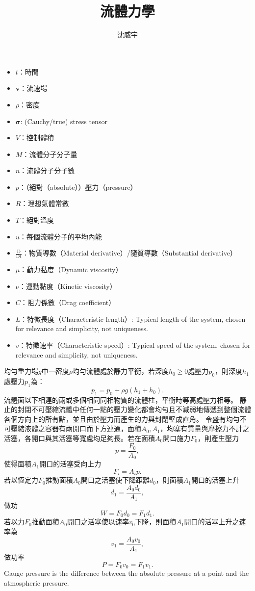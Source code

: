 \documentclass[a4paper,12pt]{article}
\begin{document}
\title{流體力學}
\author{沈威宇}
\date{\temtoday}
\titletocdoc
{}
\begin{itemize}
\item $t$：時間
\item $\mathbf{v}$：流速場
\item $\rho$：密度
\item $\boldsymbol{\sigma}$: (Cauchy/true) stress tensor
\item $V$：控制體積
\item $M$：流體分子分子量
\item $n$：流體分子分子數
\item $p$：（絕對（absolute））壓力（pressure）
\item $R$：理想氣體常數
\item $T$：絕對溫度
\item $u$：每個流體分子的平均內能
\item $\frac{\mathrm{D}}{\mathrm{D}t}$：物質導數（Material derivative）/隨質導數（Substantial derivative）
\item $\mu$：動力黏度（Dynamic viscosity）
\item $\nu$：運動黏度（Kinetic viscosity）
\item $C$：阻力係數（Drag coefficient）
\item $L$：特徵長度（Characteristic length）: Typical length of the system, chosen for relevance and simplicity, not uniqueness.
\item $v$：特徵速率（Characteristic speed）: Typical speed of the system, chosen for relevance and simplicity, not uniqueness.
\end{itemize}
均勻重力場$g$中一密度$\rho$均勻流體處於靜力平衡，若深度$h_0\geq 0$處壓力$p_0$，則深度$h_1$處壓力$p_1$為：
\[p_1=p_0+\rho g(h_1+h_0).\]
流體面以下相連的兩或多個相同同相物質的流體柱，平衡時等高處壓力相等。
靜止的封閉不可壓縮流體中任何一點的壓力變化都會均勻且不減弱地傳遞到整個流體各個方向上的所有點，並且由於壓力而產生的力與封閉壁成直角。
令盛有均勻不可壓縮液體之容器有兩開口而下方連通，面積$A_0,A_1$，均塞有質量與摩擦力不計之活塞，各開口與其活塞等寬處均足夠長。若在面積$A_0$開口施力$F_0$，則產生壓力
\[p=\frac{F_0}{A_0},\]
使得面積$A_1$開口的活塞受向上力
\[F_i=A_ip.\]
若以恆定力$F_0$推動面積$A_0$開口之活塞使下降距離$d_0$，則面積$A_1$開口的活塞上升
\[d_1=\frac{A_0d_0}{A_1},\]
做功
\[W=F_0d_0=F_1d_1.\]
若以力$F_0$推動面積$A_0$開口之活塞使以速率$v_0$下降，則面積$A_1$開口的活塞上升之速率為
\[v_1=\frac{A_0v_0}{A_1},\]
做功率
\[P=F_0v_0=F_1v_1.\]
Gauge pressure is the difference between the absolute pressure at a point and the atmospheric pressure.
\end{document}
